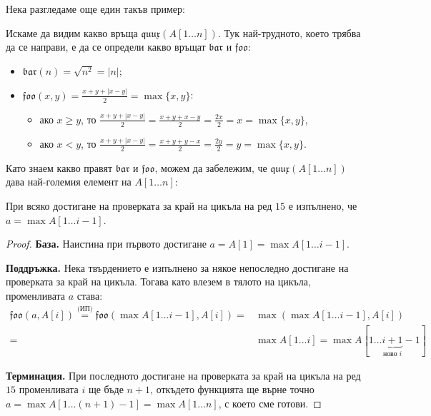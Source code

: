 \newpage

Нека разгледаме още един такъв пример:


Искаме да видим какво връща $\mathfrak{quux}(A[1 \dots n])$.
Тук най-трудното, което трябва да се направи, е да се определи какво връщат $\mathfrak{bar}$ и $\mathfrak{foo}$:
\begin{itemize}
    \item $\mathfrak{bar}(n) = \sqrt{n ^ 2} = | n |$;
    \item $\mathfrak{foo}(x, y) = \frac{x + y + |x - y|}{2}  = \max\{ x, y \}$:
          \begin{itemize}
              \item ако $x \geq y$, то $\frac{x + y + |x - y|}{2} = \frac{x + y + x - y}{2} = \frac{2x}{2} = x = \max\{ x, y \}$,
              \item ако $x < y$, то $\frac{x + y + |x - y|}{2} = \frac{x + y + y - x}{2} = \frac{2y}{2} = y = \max\{ x, y \}$.
          \end{itemize}
\end{itemize}

Като знаем какво правят $\mathfrak{bar}$ и $\mathfrak{foo}$, можем да забележим, че $\mathfrak{quux}(A[1 \dots n])$ дава най-големия елемент на $A[1 \dots n]$:
\begin{invariant}
    При всяко достигане на проверката за край на цикъла на ред $15$ е изпълнено, че $a = \max A[1 \dots i - 1]$.
\end{invariant}

\begin{proof}
    \phantom{1}

    \textbf{База.}
    Наистина при първото достигане $a = A[1] = \max A[1 \dots i - 1]$.

    \textbf{Поддръжка.}
    Нека твърдението е изпълнено за някое непоследно достигане на проверката за край на цикъла.
    Тогава като влезем в тялото на цикъла, променливата $a$ става:
    \begin{align*}
        \mathfrak{foo}(a, A[i])  \stackrel{\text{(ИП)}}{=} \mathfrak{foo}(\max A[1 \dots i - 1], A[i]) = & \max (\max A[1 \dots i - 1], A[i])                                          \\
        =                                                                                                & \max A[1 \dots i] = \max A[1 \dots \underbrace{i + 1}_{\text{ново } i} - 1]
    \end{align*}

    \textbf{Терминация.}
    При последното достигане на проверката за край на цикъла на ред $15$ променливата $i$ ще бъде $n + 1$, откъдето функцията ще върне точно $a = \max A[1 \dots (n + 1) - 1] = \max A[1 \dots n]$, с което сме готови.
\end{proof}

